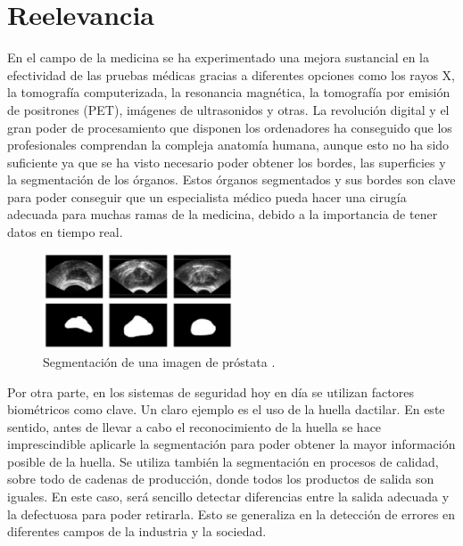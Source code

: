 
\section{Reelevancia}\label{sec:reelevancia}

En el campo de la medicina \cite{lib:suri, lib:sonka} se ha experimentado una mejora sustancial en la efectividad de las pruebas médicas gracias a diferentes opciones como los rayos X, la tomografía computerizada, la resonancia magnética, la tomografía por emisión de positrones (PET), imágenes de ultrasonidos y otras. La revolución digital y el gran poder de procesamiento que disponen los ordenadores ha conseguido que los profesionales comprendan la compleja anatomía humana, aunque esto no ha sido suficiente ya que se ha visto necesario poder obtener los bordes, las superficies y la segmentación de los órganos. Estos órganos segmentados y sus bordes son clave para poder conseguir que un especialista médico pueda hacer una cirugía adecuada para muchas ramas de la medicina, debido a la importancia de tener datos en tiempo real.\cite{url:noticiasegmentacion} %
\begin{figure}
\centering
	\includegraphics[width=0.5\textwidth]{img/imagenmedica.eps}
	\caption{Segmentación de una imagen de próstata \cite{art:bustincesegmedica}.}
	\label{img:segmentacionmedica}
\end{figure}


Por otra parte, en los sistemas de seguridad hoy en día se utilizan factores biométricos como clave. Un claro ejemplo es el uso de la huella dactilar. En este sentido, antes de llevar a cabo el reconocimiento de la huella se hace imprescindible aplicarle la segmentación para poder obtener la mayor información posible de la huella. Se utiliza también la segmentación en procesos de calidad, sobre todo de cadenas de producción, donde todos los productos de salida son iguales. En este caso, será sencillo detectar diferencias entre la salida adecuada y la defectuosa para poder retirarla. Esto se generaliza en la detección de errores en diferentes campos de la industria y la sociedad.

